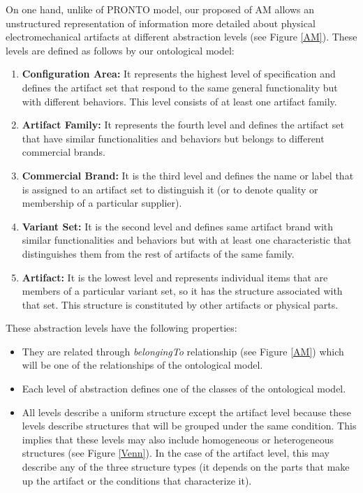 \documentclass[runningheads,a4paper]{llncs}
\begin{document}
On one hand, unlike of PRONTO model, our proposed of AM allows an unstructured representation of information more detailed about physical electromechanical artifacts at different abstraction levels (see Figure \ref{AM}). These levels are defined as follows by our ontological model:
\begin{enumerate}
  \item \textbf{Configuration Area:} It represents the highest level of specification and defines the artifact set that respond to the same general functionality but with different behaviors. This level consists of at least one artifact family.
  \item \textbf{Artifact Family:} It represents the fourth level and defines the artifact set that have similar functionalities and behaviors but belongs to different commercial brands.
  \item \textbf{Commercial Brand:} It is the third level and defines the name or label that is assigned to an artifact set to distinguish it (or to denote quality or membership of a particular supplier).
  \item \textbf{Variant Set:} It is the second level and defines same artifact brand with similar functionalities and behaviors but with at least one characteristic that distinguishes them from the rest of artifacts of the same family.
  \item \textbf{Artifact:} It is the lowest level and represents individual items that are members of a particular variant set, so it has the structure associated with that set. This structure is constituted by other artifacts or physical parts.
\end{enumerate} 

These abstraction levels have the following properties:
\begin{itemize}
\item They are related through \emph{belongingTo} relationship (see Figure \ref{AM}) which will be one of the relationships of the ontological model. 
\item Each level of abstraction defines one of the classes of the ontological model.
\item All levels describe a uniform structure except the artifact level because these levels describe structures that will be grouped under the same condition. This implies that these levels may also include homogeneous or heterogeneous structures (see Figure \ref{Venn}). In the case of the artifact level, this may describe any of the three structure types (it depends on the parts that make up the artifact or the conditions that characterize it). 
\end{itemize}
\end{document}

